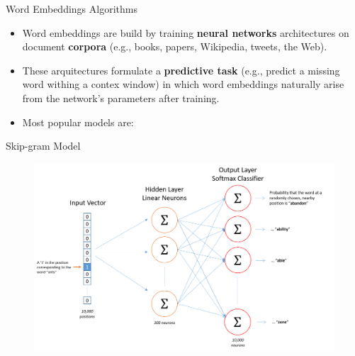 \documentclass[handout]{beamer}
\begin{document}
\begin{frame}{Word Embeddings Algorithms}
\begin{scriptsize}
\begin{itemize}
\item Word embeddings are build by training \textbf{neural networks} architectures on document \textbf{corpora} (e.g., books, papers, Wikipedia, tweets, the Web).

\item These arquitectures formulate a \textbf{predictive task} (e.g., predict a missing word withing a contex window) in which word embeddings naturally arise from the network's parameters after training.

\item Most popular models are:




\end{itemize}
\end{scriptsize}
\end{frame}

\begin{frame}{Skip-gram Model}

  \begin{figure}[h]
        	\includegraphics[scale = 0.4]{pics/skip_gram_net_arch.png}
        \end{figure}

\end{frame}
\end{document}
